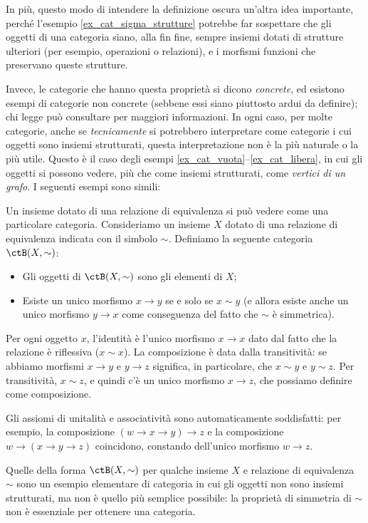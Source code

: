 In più, questo modo di intendere la definizione oscura un'altra idea importante, perché l'esempio \ref{ex_cat_sigma_strutture} potrebbe far sospettare che gli oggetti di una categoria siano, alla fin fine, sempre insiemi dotati di strutture ulteriori (per esempio, operazioni o relazioni), e i morfismi funzioni che preservano queste strutture.

Invece, le categorie che hanno questa proprietà si dicono \emph{concrete}, ed esistono esempi di categorie non concrete (sebbene essi siano piuttosto ardui da definire); chi legge può consultare \cite{Freyd1973,Kuera1971} per maggiori informazioni.
In ogni caso, per molte categorie, anche se \emph{tecnicamente} si potrebbero interpretare come categorie i cui oggetti sono insiemi strutturati, questa interpretazione non è la più naturale o la più utile. Questo è il caso degli esempi \ref{ex_cat_vuota}--\ref{ex_cat_libera}, in cui gli oggetti si possono vedere, più che come insiemi strutturati, come \emph{vertici di un grafo}.
I seguenti esempi sono simili:

\begin{example}\label{ex_cat_rel_equiv}
	Un insieme dotato di una relazione di equivalenza si può vedere come una particolare categoria. Consideriamo un insieme \(X\) dotato di una relazione di equivalenza indicata con il simbolo \(\sim\).
	Definiamo la seguente categoria \(\ctB(X,\sim)\):
	\begin{itemize}
		\item Gli oggetti di \(\ctB(X,\sim)\) sono gli elementi di \(X\);
		\item Esiste un unico morfismo \(x\to y\) se e solo se \(x\sim y\) (e allora esiste anche un unico morfismo \(y\to x\) come conseguenza del fatto che \(\sim\) è simmetrica).
	\end{itemize}
	Per ogni oggetto \(x\), l'identità è l'unico morfismo \(x\to x\) dato dal fatto che la relazione è riflessiva (\(x\sim x\)).
	La composizione è data dalla transitività: se abbiamo morfismi \(x\to y\) e \(y\to z\) significa, in particolare, che \(x\sim y\) e \(y\sim z\). Per transitività, \(x\sim z\), e quindi c'è un unico morfismo \(x\to z\), che possiamo definire come composizione.

	Gli assiomi di unitalità e associatività sono automaticamente soddisfatti: per esempio, la composizione \((w\to x\to y)\to z\) e la composizione \(w\to (x\to y\to z)\) coincidono, constando dell'unico morfismo \(w\to z\).
\end{example}
Quelle della forma \(\ctB(X,\sim)\) per qualche insieme \(X\) e relazione di equivalenza \(\sim\) sono un esempio elementare di categoria in cui gli oggetti non sono insiemi strutturati, ma non è quello più semplice possibile: la proprietà di simmetria di \(\sim\) non è essenziale per ottenere una categoria.

